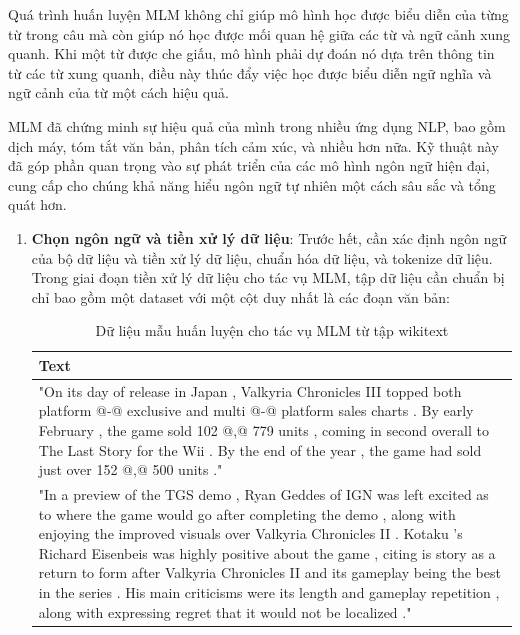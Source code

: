 \documentclass[a4paper, 12pt, openany]{book}
\begin{document}
Quá trình huấn luyện MLM không chỉ giúp mô hình học được biểu diễn của từng từ trong câu mà còn giúp nó học được mối quan hệ giữa các từ và ngữ cảnh xung quanh. Khi một từ được che giấu, mô hình phải dự đoán nó dựa trên thông tin từ các từ xung quanh, điều này thúc đẩy việc học được biểu diễn ngữ nghĩa và ngữ cảnh của từ một cách hiệu quả.

MLM đã chứng minh sự hiệu quả của mình trong nhiều ứng dụng NLP, bao gồm dịch máy, tóm tắt văn bản, phân tích cảm xúc, và nhiều hơn nữa. Kỹ thuật này đã góp phần quan trọng vào sự phát triển của các mô hình ngôn ngữ hiện đại, cung cấp cho chúng khả năng hiểu ngôn ngữ tự nhiên một cách sâu sắc và tổng quát hơn.
\begin{enumerate}
    \item \textbf{Chọn ngôn ngữ và tiền xử lý dữ liệu}: Trước hết, cần xác định ngôn ngữ của bộ dữ liệu và tiền xử lý dữ liệu, chuẩn hóa dữ liệu, và tokenize dữ liệu.
    Trong giai đoạn tiền xử lý dữ liệu cho tác vụ MLM, tập dữ liệu cần chuẩn bị chỉ bao gồm một dataset với một cột duy nhất là các đoạn văn bản:

    \begin{table}[H]
        \centering
        \begin{tabularx}{\textwidth}{|X|}
            \hline
                \textbf{Text}
            \\
            \hline
            "On its day of release in Japan , Valkyria Chronicles III topped both platform @-@ exclusive and multi @-@ platform sales charts . By early February , the game sold 102 @,@ 779 units , coming in second overall to The Last Story for the Wii . By the end of the year , the game had sold just over 152 @,@ 500 units ." \\ 
            \hline
            "In a preview of the TGS demo , Ryan Geddes of IGN was left excited as to where the game would go after completing the demo , along with enjoying the improved visuals over Valkyria Chronicles II . Kotaku 's Richard Eisenbeis was highly positive about the game , citing is story as a return to form after Valkyria Chronicles II and its gameplay being the best in the series . His main criticisms were its length and gameplay repetition , along with expressing regret that it would not be localized ." \\
            \hline
        \end{tabularx}
        \caption{Dữ liệu mẫu huấn luyện cho tác vụ MLM từ tập wikitext}
    \end{table}


\end{enumerate}
\end{document}
